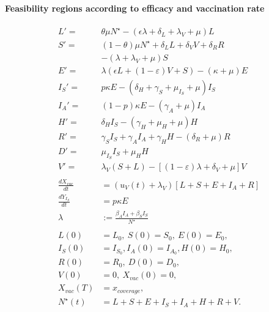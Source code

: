 \paragraph{Feasibility regions according to efficacy and vaccination rate}
%
\begin{equation}
    \label{eqn:vacination_dynamics}
    \begin{aligned}
        L' =&  \theta \mu N^{\star}
                -(\epsilon \lambda + \delta_L + \lambda_V +\mu) L 
        \\
        S' =&
        	(1 - \theta) \mu N^\star
            + \delta_L L
            + \delta_V V
            + \delta_R R
        	\\
            &-
            \left(
            	\lambda + \lambda_V + \mu
            \right) S
        \\
        E' =&
                \lambda (\epsilon L + (1-\varepsilon) V + S)
                - (\kappa + \mu) E
        \\
        I_S' =&
        	p \kappa E
            - 
            (	
            	\delta_H +
            	\gamma_S +
                \mu_{I_S} +
                \mu
            ) I_S
        \\
        I_A' = &
                (1 - p) \kappa E - (\gamma_A + \mu) I_A
        \\
        H' = &
        		\delta_H I_S - (\gamma_H + \mu_H + \mu) H
        \\
        R' = &
            	\gamma_S I_S +
                \gamma_A I_A +
                \gamma_H H 
                - (\delta_R + \mu) R
        \\
        D'  = &
                \mu_{I_S} I_S + \mu_H H
        \\
        V' = &
            \lambda_V  (S + L)
            - \left[
            	(1 - \varepsilon) \lambda
                + \delta_V
                + \mu
            \right ] V
        \\
        \\
            \frac{dX_{vac}}{dt}
            	&=
            	(u_V(t) + \lambda_V)
            	\left[
            		L + S + E + I_A + R
            	\right]
        \\
            \frac{d Y_{I_S}}{dt}
            	& = p \kappa E
        \\
            \lambda &:=
                \frac{\beta_A I_A + \beta_S I_S}{N^{\star}}
        \\
        \\
            L(0) &= L_0, 
            \ S(0) = S_0, 
            \ E(0) = E_0, 
        \\
            I_S(0) &= I_{S_{0}},
            I_A(0) = I_{A_{0}},
            H(0) = H_0, 
        \\
            R(0) &= R_0, \ D(0) = D_0,
      \\
            V(0) &= 0, \ X_{vac}(0) = 0, \quad
      \\
            X_{vac}(T) &= x_{coverage},
      \\
            N^{\star}(t) &=
                L + S +E + I_S + I_A +
                H + R + V .
        \end{aligned}
\end{equation}
